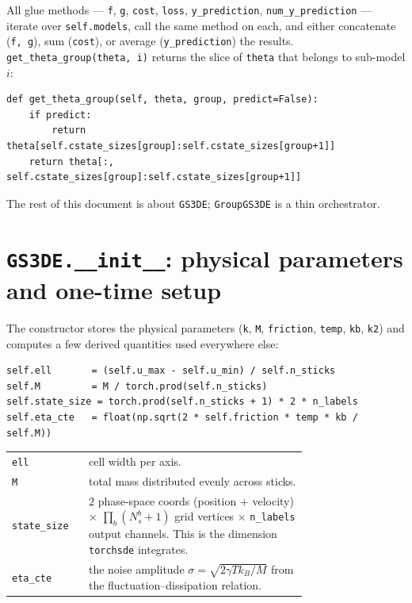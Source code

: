 \documentclass[11pt]{article}
\newcommand{\code}[1]{\texttt{\small #1}}
\begin{document}
All glue methods --- \code{f}, \code{g}, \code{cost}, \code{loss}, \code{y\_prediction}, \code{num\_y\_prediction} --- iterate over \code{self.models}, call the same method on each, and either concatenate (\code{f, g}), sum (\code{cost}), or average (\code{y\_prediction}) the results. \code{get\_theta\_group(theta, i)} returns the slice of \code{theta} that belongs to sub-model $i$:
\begin{lstlisting}
def get_theta_group(self, theta, group, predict=False):
    if predict:
        return theta[self.cstate_sizes[group]:self.cstate_sizes[group+1]]
    return theta[:, self.cstate_sizes[group]:self.cstate_sizes[group+1]]
\end{lstlisting}

The rest of this document is about \code{GS3DE}; \code{GroupGS3DE} is a thin orchestrator.

\section{\texttt{GS3DE.\_\_init\_\_}: physical parameters and one-time setup}

The constructor stores the physical parameters (\code{k}, \code{M}, \code{friction}, \code{temp}, \code{kb}, \code{k2}) and computes a few derived quantities used everywhere else:

\begin{lstlisting}
self.ell       = (self.u_max - self.u_min) / self.n_sticks
self.M         = M / torch.prod(self.n_sticks)
self.state_size = torch.prod(self.n_sticks + 1) * 2 * n_labels
self.eta_cte   = float(np.sqrt(2 * self.friction * temp * kb / self.M))
\end{lstlisting}

\noindent\begin{tabular}{@{}lp{0.74\linewidth}@{}}
\toprule
\code{ell}        & cell width per axis. \\
\code{M}          & total mass distributed evenly across sticks. \\
\code{state\_size} & $2$ phase-space coords (position + velocity) $\times$ $\prod_b(N_s^b+1)$ grid vertices $\times$ \code{n\_labels} output channels. This is the dimension \code{torchsde} integrates. \\
\code{eta\_cte}   & the noise amplitude $\sigma = \sqrt{2\gamma T k_B / M}$ from the fluctuation--dissipation relation. \\
\bottomrule
\end{tabular}
\end{document}
